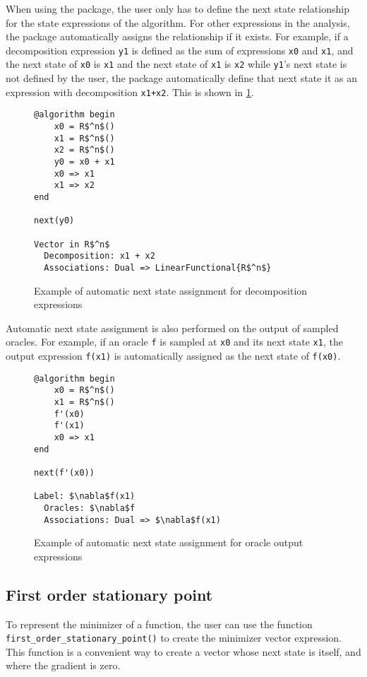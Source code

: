 When using the package, the user only has to define the next state relationship for the state expressions of the algorithm. For other expressions in the analysis, the package automatically assigns the relationship if it exists. For example, if a decomposition expression \texttt{y1} is defined as the sum of expressions \texttt{x0} and \texttt{x1}, and the next state of \texttt{x0} is \texttt{x1} and the next state of \texttt{x1} is \texttt{x2} while \texttt{y1}'s next state is not defined by the user, the package automatically define that next state it as an expression with decomposition \texttt{x1+x2}. This is shown in \cref{ex_nextdecomp}.

\begin{figure}[h!]
	\begin{lstlisting}[mathescape]
@algorithm begin
	x0 = R$^n$()
	x1 = R$^n$()
	x2 = R$^n$()
	y0 = x0 + x1
	x0 => x1
	x1 => x2
end

next(y0)

Vector in R$^n$
  Decomposition: x1 + x2
  Associations: Dual => LinearFunctional{R$^n$}
\end{lstlisting}
\caption{Example of automatic next state assignment for decomposition expressions}
\label{ex_nextdecomp}
\end{figure}

Automatic next state assignment is also performed on the output of sampled oracles. For example, if an oracle \texttt{f} is sampled at \texttt{x0} and its next state \texttt{x1}, the output expression \texttt{f(x1)} is automatically assigned as the next state of \texttt{f(x0)}.

\begin{figure}[h!]
	\begin{lstlisting}[mathescape]
@algorithm begin
	x0 = R$^n$()
	x1 = R$^n$()
	f'(x0)
	f'(x1)
	x0 => x1
end

next(f'(x0))

Label: $\nabla$f(x1)
  Oracles: $\nabla$f
  Associations: Dual => $\nabla$f(x1)
\end{lstlisting}
\caption{Example of automatic next state assignment for oracle output expressions}
\label{ex_nextsample}
\end{figure}

\subsection*{First order stationary point}

To represent the minimizer of a function, the user can use the function \texttt{first\_order\_\allowbreak stationary\_point()} to create the minimizer vector expression. This function is a convenient way to create a vector whose next state is itself, and where the gradient is zero.

